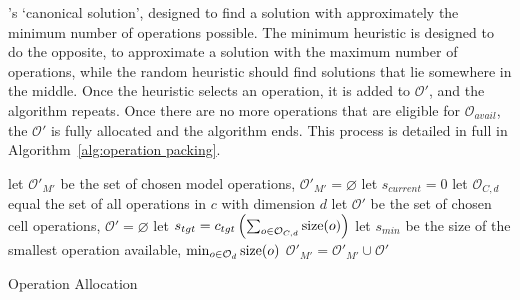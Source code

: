 \citeauthor{martello1980}'s `canonical solution', designed to find a solution with approximately the minimum number of
operations possible. The minimum heuristic is designed to do the opposite, to approximate a solution with the maximum number of
operations, while the random heuristic should find solutions that lie somewhere in the middle.
Once the heuristic selects an operation, it is added to $\mathcal{O}'$, and the algorithm repeats.
Once there are no more operations that are eligible for $\mathcal{O}_{avail}$, the $\mathcal{O}'$ is fully allocated and the
algorithm ends. This process is detailed in full in Algorithm~\ref{alg:operation packing}.

\begin{algorithm}
	\SetAlgoLined
	let $\mathcal{O}'_{M'}$ be the set of chosen model operations, $\mathcal{O}'_{M'} = \varnothing$\;
	let $s_{current} = 0$\;
	 {
		 {
			let $\mathcal{O}_{C,d}$ equal the set of all operations in $c$ with dimension $d$\;
			let $\mathcal{O}'$ be the set of chosen cell operations, $\mathcal{O}' = \varnothing$ \;
			 let $s_{tgt} = c_{tgt} \left( \sum_{o \in \mathcal{O}_{C,d}}{\text{size}(o)} \right)$ \;
			 {
				let $s_{min}$ be the size of the smallest operation available, $\min_{o \in \mathcal{O}_d} \text{size}(o)$\;
			}
			$\mathcal{O}'_{M'} = \mathcal{O}'_{M'} \cup \mathcal{O}'$\;
		}
	}
	\caption{Operation Allocation}
	\label{alg:operation packing}
\end{algorithm}


